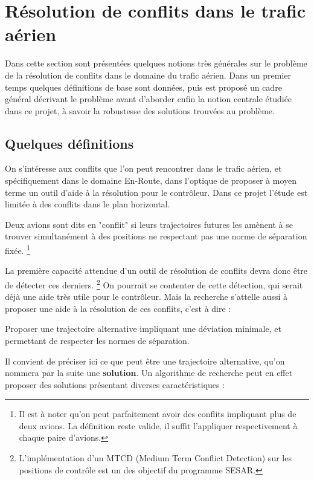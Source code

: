 \chapter{Résolution de conflits dans le trafic aérien}

Dans cette section sont présentées quelques notions très générales sur le problème de la résolution de conflits dans le domaine du trafic aérien. Dans un premier temps quelques définitions de base sont données, puis est proposé un cadre général décrivant le problème avant d'aborder enfin la notion centrale étudiée dans ce projet, à savoir la robustesse des solutions trouvées au problème.

\section{Quelques définitions} 

On s'intéresse aux conflits que l'on peut rencontrer dans le trafic aérien, et spécifiquement dans le domaine En-Route, dans l'optique de proposer à moyen terme un outil d'aide à la résolution pour le contrôleur. Dans ce projet l'étude est limitée à des conflits dans le plan horizontal.

\begin{definition}
Deux avions sont dits en "conflit" si leurs trajectoires futures les amènent à se trouver simultanément à des positions ne respectant pas une norme de séparation fixée. \footnote{Il est à noter qu'on peut parfaitement avoir des conflits impliquant plus de deux avions. La définition reste valide, il suffit l'appliquer respectivement à chaque paire d'avions.}
\end{definition}

La première capacité attendue d'un outil de résolution de conflits devra donc être de détecter ces derniers. \footnote{L'implémentation d'un MTCD (Medium Term Conflict Detection) sur les positions de contrôle est un des objectif du programme SESAR.} On pourrait se contenter de cette détection, qui serait déjà une aide très utile pour le contrôleur. Mais la recherche s'attelle aussi à proposer une aide à la résolution de ces conflits, c'est à dire :

\begin{definition}
Proposer une trajectoire alternative impliquant une déviation minimale, et permettant de respecter les normes de séparation.
\end{definition}

Il convient de préciser ici ce que peut être une trajectoire alternative, qu'on nommera par la suite une \textbf{solution}. Un algorithme de recherche peut en effet proposer des solutions présentant diverses caractéristiques : \\

